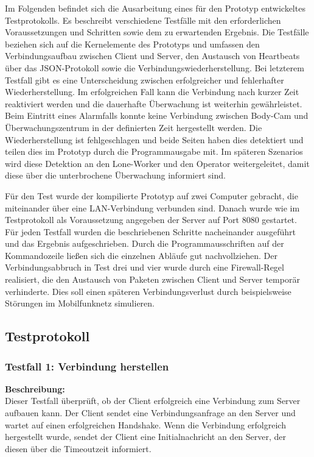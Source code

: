 \documentclass[thesis.tex]{subfiles}
\begin{document}
Im Folgenden befindet sich die Ausarbeitung eines für den Prototyp entwickeltes Testprotokolls.
Es beschreibt verschiedene Testfälle mit den erforderlichen Voraussetzungen und Schritten sowie dem zu erwartenden Ergebnis.
Die Testfälle beziehen sich auf die Kernelemente des Prototyps und umfassen den Verbindungsaufbau zwischen Client und Server,
den Austausch von Heartbeats über das JSON-Protokoll sowie die Verbindungswiederherstellung.
Bei letzterem Testfall gibt es eine Unterscheidung zwischen erfolgreicher und fehlerhafter Wiederherstellung.
Im erfolgreichen Fall kann die Verbindung nach kurzer Zeit reaktiviert werden und die dauerhafte Überwachung ist weiterhin gewährleistet.
Beim Eintritt eines Alarmfalls konnte keine Verbindung zwischen Body-Cam und Überwachungszentrum in der definierten Zeit hergestellt werden.
Die Wiederherstellung ist fehlgeschlagen und beide Seiten haben dies detektiert und teilen dies im Prototyp durch die Programmausgabe mit.
Im späteren Szenarios wird diese Detektion an den Lone-Worker und den Operator weitergeleitet, damit diese über die unterbrochene Überwachung informiert sind.

Für den Test wurde der kompilierte Prototyp auf zwei Computer gebracht, die miteinander über eine LAN-Verbindung verbunden sind.
Danach wurde wie im Testprotokoll als Voraussetzung angegeben der Server auf Port 8080 gestartet.
Für jeden Testfall wurden die beschriebenen Schritte nacheinander ausgeführt und das Ergebnis aufgeschrieben.
Durch die Programmausschriften auf der Kommandozeile ließen sich die einzelnen Abläufe gut nachvollziehen.
Der Verbindungsabbruch in Test drei und vier wurde durch eine Firewall-Regel realisiert, die den Austausch von Paketen zwischen Client und Server temporär verhinderte.
Dies soll einen späteren Verbindungsverlust durch beispielsweise Störungen im Mobilfunknetz simulieren.

\pagebreak

\subsection*{Testprotokoll}\label{anhang:testprotokoll}

\subsubsection*{Testfall 1: Verbindung herstellen}

\textbf{Beschreibung:}\\
Dieser Testfall überprüft, ob der Client erfolgreich eine Verbindung zum Server aufbauen kann. Der Client sendet eine Verbindungsanfrage an den Server und wartet auf einen erfolgreichen Handshake. Wenn die Verbindung erfolgreich hergestellt wurde, sendet der Client eine Initialnachricht an den Server, der diesen über die Timeoutzeit informiert.
\end{document}
